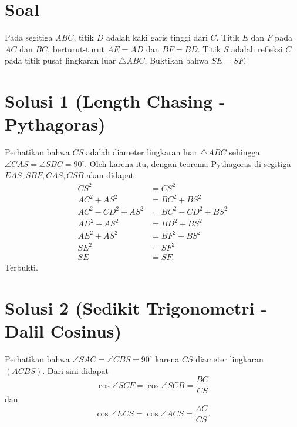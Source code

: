 \section{Soal}
Pada segitiga $ABC$, titik $D$ adalah kaki garis tinggi dari $C$. Titik $E$ dan $F$ pada $AC$ dan $BC$, berturut-turut $AE = AD$ dan $BF = BD$. Titik $S$ adalah refleksi $C$ pada titik pusat lingkaran luar $\triangle ABC$. Buktikan bahwa $SE=SF$.




\newpage
\section{Solusi 1 (Length Chasing - Pythagoras)}

Perhatikan bahwa $CS$ adalah diameter lingkaran luar $\triangle ABC$ sehingga $\angle CAS = \angle SBC = 90^\circ$. Oleh karena itu, dengan teorema Pythagoras di segitiga $EAS, SBF, CAS, CSB$ akan didapat
\begin{align*}
    CS^2 &= CS^2\\
    AC^2 + AS^2 &= BC^2+BS^2\\
    AC^2 - CD^2 + AS^2 &= BC^2 - CD^2 + BS^2\\
    AD^2 + AS^2 &= BD^2 + BS^2\\
    AE^2 + AS^2 &= BF^2 + BS^2\\
    SE^2 &= SF^2\\
    SE &= SF.
\end{align*}
Terbukti.

\newpage
\section{Solusi 2 (Sedikit Trigonometri - Dalil Cosinus)}
Perhatikan bahwa $\angle SAC = \angle CBS = 90^\circ$ karena $CS$ diameter lingkaran $(ACBS)$. Dari sini didapat 
$$\cos \angle SCF = \cos \angle SCB = \frac{BC}{CS}$$ 
dan 
$$\cos \angle ECS = \cos \angle ACS = \frac{AC}{CS}.$$

